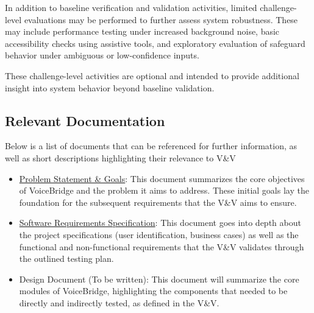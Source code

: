 \documentclass[12pt, titlepage]{article}
\begin{document}
In addition to baseline verification and validation activities, limited challenge-level evaluations may be performed to further assess system robustness. These may include performance testing under increased background noise, basic accessibility checks using assistive tools, and exploratory evaluation of safeguard behavior under ambiguous or low-confidence inputs.

These challenge-level activities are optional and intended to provide additional insight into system behavior beyond baseline validation.

\subsection{Relevant Documentation}




Below is a list of documents that can be referenced for further information, as well as short descriptions highlighting their relevance to V\&V
\begin{itemize}
  \item \href{https://github.com/speech-buddies/VoiceBridge/blob/main/docs/ProblemStatementAndGoals/ProblemStatement.pdf}{Problem Statement \& Goals}: This document summarizes the core objectives of VoiceBridge and the problem it aims to address. These initial goals lay the foundation for the subsequent requirements that the V\&V aims to ensure.
  \item \href{https://github.com/speech-buddies/VoiceBridge/blob/main/docs/SRS-Volere/SRS.pdf}{Software Requirements Specification}: This document goes into depth about the project specifications (user identification, business cases) as well as the functional and non-functional requirements that the V\&V validates through the outlined testing plan. 
  \item Design Document (To be written): This document will summarize the core modules of VoiceBridge, highlighting the components that needed to be directly and indirectly tested, as defined in the V\&V.
\end{itemize}
\end{document}
